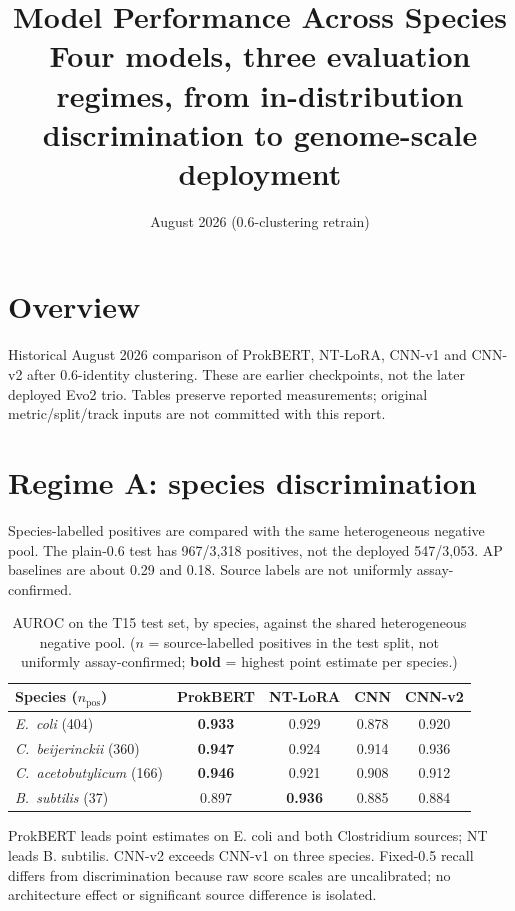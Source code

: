 \documentclass{article}
\title{Model Performance Across Species\\ \large Four models, three evaluation regimes, from in-distribution discrimination to genome-scale deployment}
\date{August 2026 (0.6-clustering retrain)}
\author{}
\begin{document}
\maketitle

\section{Overview}
Historical August 2026 comparison of ProkBERT, NT-LoRA, CNN-v1 and CNN-v2 after 0.6-identity clustering. These are earlier checkpoints, not the later deployed Evo2 trio. Tables preserve reported measurements; original metric/split/track inputs are not committed with this report.

\section{Regime A: species discrimination}
Species-labelled positives are compared with the same heterogeneous negative pool. The plain-0.6 test has 967/3,318 positives, not the deployed 547/3,053. AP baselines are about 0.29 and 0.18. Source labels are not uniformly assay-confirmed.

\begin{table}[h]
\centering
\caption{AUROC on the T15 test set, by species, against the shared heterogeneous negative pool. ($n$ = source-labelled positives in the test split, not uniformly assay-confirmed; \textbf{bold} = highest point estimate per species.)}
\begin{tabular}{lcccc}
\toprule
Species ($n_{\text{pos}}$) & ProkBERT & NT-LoRA & CNN & CNN-v2 \\
\midrule
\emph{E.\ coli} (404)              & \textbf{0.933} & 0.929 & 0.878 & 0.920 \\
\emph{C.\ beijerinckii} (360)      & \textbf{0.947} & 0.924 & 0.914 & 0.936 \\
\emph{C.\ acetobutylicum} (166)    & \textbf{0.946} & 0.921 & 0.908 & 0.912 \\
\emph{B.\ subtilis} (37)           & 0.897 & \textbf{0.936} & 0.885 & 0.884 \\
\bottomrule
\end{tabular}
\end{table}

ProkBERT leads point estimates on E. coli and both Clostridium sources; NT leads B. subtilis. CNN-v2 exceeds CNN-v1 on three species. Fixed-0.5 recall differs from discrimination because raw score scales are uncalibrated; no architecture effect or significant source difference is isolated.
\end{document}
